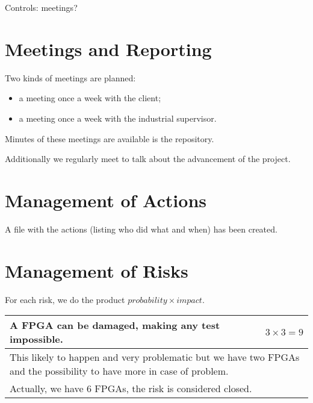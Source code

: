 \documentclass{article}
\begin{document}
    Controls: meetings?


  \section{Meetings and Reporting}
    Two kinds of meetings are planned:
    \begin{itemize}
        \item a meeting once a week with the client;
        \item a meeting once a week with the industrial supervisor.
    \end{itemize}
    Minutes of these meetings are available is the repository.

    Additionally we regularly meet to talk about the advancement of the project.

  \section{Management of Actions}
    A file with the actions (listing who did what and when) has been created.

  \section{Management of Risks}

    For each risk, we do the product $probability \times impact$.
    \vspace{12pt}

    \begin{tabular}{|p{}|r|}\hline
        A FPGA can be damaged, making any test impossible. & $3 \times 3 = 9$ \\ \hline
        \multicolumn{2}{|p{\textwidth}|}{This likely to happen and very problematic but we have two FPGAs and the possibility to have more in case of problem.} \\ \hline
        \multicolumn{2}{|p{\textwidth}|}{Actually, we have 6 FPGAs, the risk is considered closed.} \\ \hline
    \end{tabular}
    \vspace{12pt}
\end{document}
